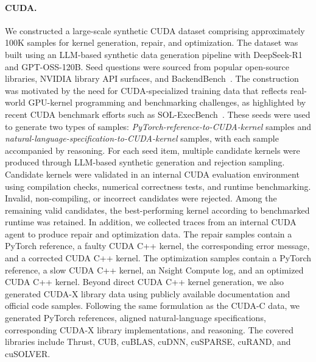 \paragraph{CUDA.}
We constructed a large-scale synthetic CUDA dataset comprising approximately 100K samples for kernel generation, repair, and optimization. The dataset was built using an LLM-based synthetic data generation pipeline with DeepSeek-R1 and GPT-OSS-120B. Seed questions were sourced from popular open-source libraries, NVIDIA library API surfaces, and BackendBench~\citep{saroufimbackendbench}. The construction was motivated by the need for CUDA-specialized training data that reflects real-world GPU-kernel programming and benchmarking challenges, as highlighted by recent CUDA benchmark efforts such as SOL-ExecBench~\citep{lin2026solexecbenchspeedoflightbenchmarkingrealworld}. These seeds were used to generate two types of samples: \emph{PyTorch-reference-to-CUDA-kernel} samples and \emph{natural-language-specification-to-CUDA-kernel} samples, with each sample accompanied by reasoning. For each seed item, multiple candidate kernels were produced through LLM-based synthetic generation and rejection sampling. Candidate kernels were validated in an internal CUDA evaluation environment using compilation checks, numerical correctness tests, and runtime benchmarking. Invalid, non-compiling, or incorrect candidates were rejected. Among the remaining valid candidates, the best-performing kernel according to benchmarked runtime was retained. In addition, we collected traces from an internal CUDA agent to produce repair and optimization data. The repair samples contain a PyTorch reference, a faulty CUDA C++ kernel, the corresponding error message, and a corrected CUDA C++ kernel. The optimization samples contain a PyTorch reference, a slow CUDA C++ kernel, an Nsight Compute log, and an optimized CUDA C++ kernel. Beyond direct CUDA C++ kernel generation, we also generated CUDA-X library  data using publicly available documentation and official code samples. Following the same formulation as the CUDA-C data, we generated PyTorch references, aligned natural-language specifications, corresponding CUDA-X library implementations, and reasoning. The covered libraries include Thrust, CUB, cuBLAS, cuDNN, cuSPARSE, cuRAND, and cuSOLVER.

